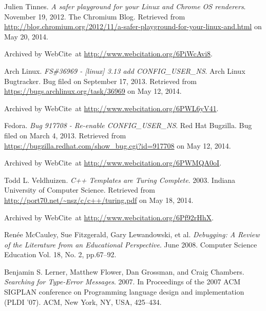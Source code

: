 \begin{thebibliography}{9}

Julien Tinnes. \emph{A safer playground for your Linux and Chrome OS
renderers}. November 19, 2012. The Chromium Blog. Retrieved from
\url{http://blog.chromium.org/2012/11/a-safer-playground-for-your-linux-and.html}
on May 20, 2014.

Archived by WebCite\textsuperscript{\textregistered}\ at
\url{http://www.webcitation.org/6PiWcAvi8}.


Arch Linux. \emph{FS\#36969 - [linux] 3.13 add CONFIG\_USER\_NS}. Arch Linux
Bugtracker. Bug filed on September 17, 2013. Retrieved from
\url{https://bugs.archlinux.org/task/36969} on May 12, 2014.

Archived by WebCite\textsuperscript{\textregistered}\ at
\url{http://www.webcitation.org/6PWL6yV41}.


Fedora. \emph{Bug 917708 - Re-enable CONFIG\_USER\_NS}. Red Hat Bugzilla. Bug
filed on March 4, 2013. Retrieved from
\url{https://bugzilla.redhat.com/show_bug.cgi?id=917708} on May 12, 2014.

Archived by WebCite\textsuperscript{\textregistered}\ at
\url{http://www.webcitation.org/6PWMQA0oI}.


Todd L. Veldhuizen. \emph{C++ Templates are Turing Complete}. 2003. Indiana
University of Computer Science. Retrieved from
\url{http://port70.net/~nsz/c/c++/turing.pdf} on May 18, 2014. 

Archived by WebCite\textsuperscript{\textregistered}\ at
\url{http://www.webcitation.org/6Pf92rHhX}.


Ren\'ee McCauley, Sue Fitzgerald, Gary Lewandowski, et al. \emph{Debugging: A
Review of the Literature from an Educational Perspective}. June 2008. Computer
Science Education Vol. 18, No. 2, pp.67--92.


Benjamin S. Lerner, Matthew Flower, Dan Grossman, and  Craig Chambers.
\emph{Searching for Type-Error Messages}. 2007. In Proceedings of the 2007 ACM
SIGPLAN conference on Programming language design and implementation (PLDI
'07). ACM, New York, NY, USA, 425--434. 


\end{thebibliography}

